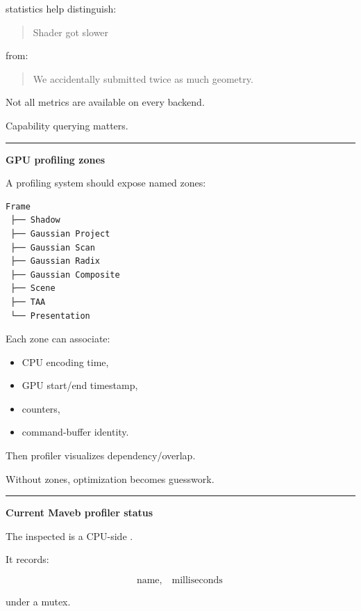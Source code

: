 statistics help distinguish:

\begin{quote}
Shader got slower
\end{quote}

from:

\begin{quote}
We accidentally submitted twice as much geometry.
\end{quote}

Not all metrics are available on every backend.

Capability querying matters.

\begin{center}\rule{0.5\linewidth}{0.5pt}\end{center}

\textbf{GPU profiling zones}

A profiling system should expose named zones:

\protect{}\label{p10-zones}%
\begin{verbatim}
Frame
 ├── Shadow
 ├── Gaussian Project
 ├── Gaussian Scan
 ├── Gaussian Radix
 ├── Gaussian Composite
 ├── Scene
 ├── TAA
 └── Presentation
\end{verbatim}

Each zone can associate:

\begin{itemize}
\tightlist
\item
  CPU encoding time,
\item
  GPU start/end timestamp,
\item
  counters,
\item
  command-buffer identity.
\end{itemize}

Then profiler visualizes dependency/overlap.

Without zones, optimization becomes guesswork.

\begin{center}\rule{0.5\linewidth}{0.5pt}\end{center}

\textbf{Current Maveb profiler status}

The inspected  is a CPU-side .

It records:

\[
\text{name},
\quad
\text{milliseconds}
\]

under a mutex.

